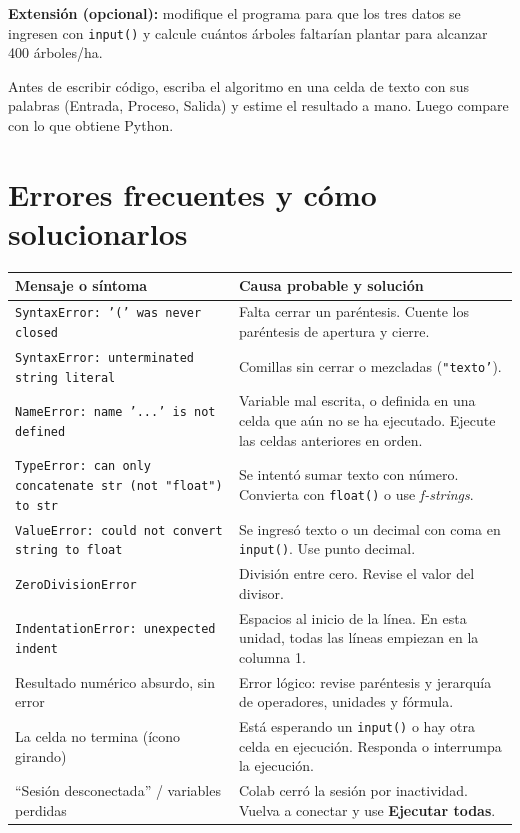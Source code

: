 \documentclass[11pt,a4paper]{article}
\newcommand{\code}[1]{\texttt{#1}}
\newcommand{\menu}[1]{\textbf{\color{moradoOsc}#1}}
\begin{document}
\textbf{Extensión (opcional):} modifique el programa para que los tres datos se ingresen con \code{input()} y calcule cuántos árboles faltarían plantar para alcanzar 400 árboles/ha.

\begin{tip}
Antes de escribir código, escriba el algoritmo en una celda de texto con sus palabras (Entrada, Proceso, Salida) y estime el resultado a mano. Luego compare con lo que obtiene Python.
\end{tip}

\section{Errores frecuentes y cómo solucionarlos}

\begin{center}
\renewcommand{\arraystretch}{1.35}
\begin{tabularx}{\textwidth}{>{\raggedright\arraybackslash}p{4.6cm} X}
\toprule
\textbf{Mensaje o síntoma} & \textbf{Causa probable y solución} \\
\midrule
\code{SyntaxError: '(' was never closed} & Falta cerrar un paréntesis. Cuente los paréntesis de apertura y cierre. \\
\code{SyntaxError: unterminated string literal} & Comillas sin cerrar o mezcladas (\code{"texto'}). \\
\code{NameError: name '...' is not defined} & Variable mal escrita, o definida en una celda que aún no se ha ejecutado. Ejecute las celdas anteriores en orden. \\
\code{TypeError: can only concatenate str (not "float") to str} & Se intentó sumar texto con número. Convierta con \code{float()} o use \emph{f-strings}. \\
\code{ValueError: could not convert string to float} & Se ingresó texto o un decimal con coma en \code{input()}. Use punto decimal. \\
\code{ZeroDivisionError} & División entre cero. Revise el valor del divisor. \\
\code{IndentationError: unexpected indent} & Espacios al inicio de la línea. En esta unidad, todas las líneas empiezan en la columna 1. \\
Resultado numérico absurdo, sin error & Error lógico: revise paréntesis y jerarquía de operadores, unidades y fórmula. \\
La celda no termina (ícono girando) & Está esperando un \code{input()} o hay otra celda en ejecución. Responda o interrumpa la ejecución. \\
``Sesión desconectada'' / variables perdidas & Colab cerró la sesión por inactividad. Vuelva a conectar y use \menu{Ejecutar todas}. \\
\bottomrule
\end{tabularx}
\end{center}
\end{document}
